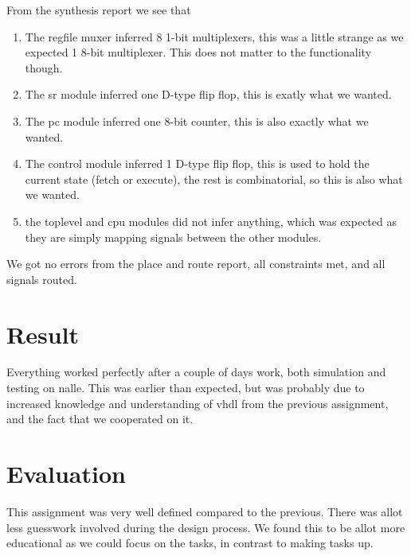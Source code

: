 \documentclass[10pt]{report}
\begin{document}
From the synthesis report we see that
\begin{enumerate}
\item The regfile muxer inferred 8 1-bit multiplexers, this was a
  little strange as we expected 1 8-bit multiplexer.  This does not
  matter to the functionality though.
\item The sr module inferred one D-type flip flop, this is exatly what
  we wanted.
\item The pc module inferred one 8-bit counter, this is also exactly
  what we wanted.
\item The control module inferred 1 D-type flip flop, this is used to
  hold the current state (fetch or execute), the rest is
  combinatorial, so this is also what we wanted.
\item the toplevel and cpu modules did not infer anything, which was
  expected as they are simply mapping signals between the other
  modules.
\end{enumerate}

We got no errors from the place and route report, all constraints met,
and all signals routed.

\section*{Result}


Everything worked perfectly after a couple of days work, 
both simulation and testing on nalle. This was earlier than expected, 
but was probably due to increased knowledge and understanding of  
vhdl from the previous assignment, and the fact that we cooperated on it.


\section*{Evaluation}


This assignment was very well defined compared to the previous. There was
allot less guesswork involved during the design process. We found this to
be allot more educational as we could focus on the tasks, in contrast to
making tasks up.
\end{document}
